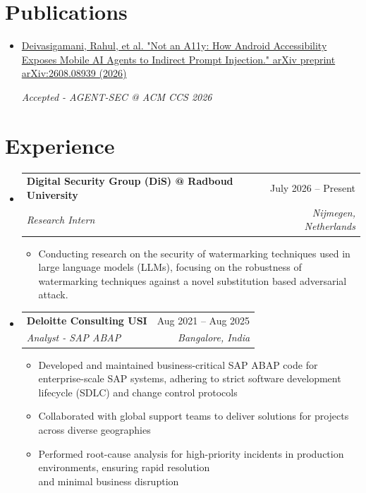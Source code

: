 \documentclass[letterpaper,11pt]{article}
\makeatletter
\newcommand{\resumeItem}[1]{
  \item\small{
    {#1 \vspace{-2pt}}
  }
}
\newcommand{\resumeSubheading}[4]{
  \vspace{-2pt}\item
    \begin{tabular*}{0.97\textwidth}[t]{l@{\extracolsep{\fill}}r}
      \textbf{#1} & #2 \\
      \textit{\small#3} & \textit{\small #4} \\
    \end{tabular*}\vspace{-7pt}
}
\newcommand{\resumeSubSubheading}[2]{
    \item
    \begin{tabular*}{0.97\textwidth}{l@{\extracolsep{\fill}}r}
      \textit{\small#1} & \textit{\small #2} \\
    \end{tabular*}\vspace{-7pt}
}
\newcommand{\resumeSubHeadingListStart}{\begin{itemize}[leftmargin=0.15in, label={}]}
\newcommand{\resumeSubHeadingListEnd}{\end{itemize}}
\newcommand{\resumeItemListStart}{\begin{itemize}}
\newcommand{\resumeItemListEnd}{\end{itemize}\vspace{-5pt}}
\makeatother
\begin{document}
\section{Publications}
  \resumeSubHeadingListStart
    \resumeItem{\href{https://doi.org/10.48550/arXiv.2608.08939}{Deivasigamani, Rahul, et al. "Not an A11y: How Android Accessibility Exposes Mobile AI Agents to Indirect Prompt Injection." arXiv preprint arXiv:2608.08939 (2026)}} 
    \hspace*{\fill}\textit{Accepted - AGENT-SEC @ ACM CCS 2026}
  \resumeSubHeadingListEnd


\section{Experience}
  \resumeSubHeadingListStart
    
  \resumeSubheading
      {Digital Security Group (DiS) @ Radboud University}{July 2026 -- Present}
      {Research Intern}{Nijmegen, Netherlands}
        \vspace{0.15pt}      
      \resumeItemListStart
        \resumeItem{Conducting research on the security of watermarking techniques used in large language models (LLMs), focusing on the robustness of watermarking techniques against a novel substitution based adversarial attack.}
      \resumeItemListEnd

    \resumeSubheading
      {Deloitte Consulting USI}{Aug 2021 -- Aug 2025}
      {Analyst - SAP ABAP}{Bangalore, India}
        \vspace{0.15pt}      
      \resumeItemListStart
        \resumeItem{Developed and maintained business-critical SAP ABAP code for enterprise-scale SAP systems, adhering to strict software development lifecycle (SDLC) and change control protocols}
        \resumeItem{Collaborated with global support teams to deliver solutions for projects across diverse geographies}
        \resumeItem{Performed root-cause analysis for high-priority incidents in production environments, ensuring rapid resolution \\and minimal business disruption}
      \resumeItemListEnd


      
  \resumeSubHeadingListEnd
%
\end{document}
